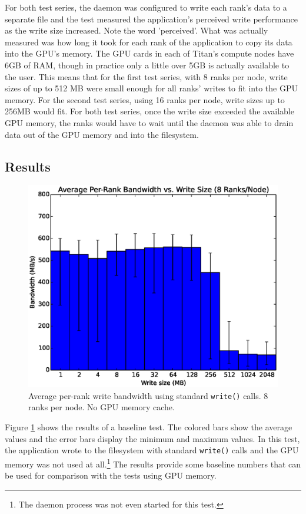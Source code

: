 For both test series, the daemon was configured to write each rank's data to a separate file and the test measured the application's perceived write performance as the write size increased.  Note the word 'perceived'.  What was actually measured was how long it took for each rank of the application to copy its data into the GPU's memory.   The GPU cards in each of Titan's compute nodes have 6GB of RAM, though in practice only a little over 5GB is actually available to the user.  This means that for the first test series, with 8 ranks per node, write sizes of up to 512 MB were small enough for all ranks' writes to fit into the GPU memory.  For the second test series, using 16 ranks per node, write sizes up to 256MB would fit.  For both test series, once the write size exceeded the available GPU memory, the ranks would have to wait until the daemon was able to drain data out of the GPU memory and into the filesystem.


\subsection{Results}
\label{subsec:results}

\begin{figure}
\includegraphics[width=\linewidth]{figures/figure_1.eps}
\caption{Average per-rank write bandwidth using standard \texttt{write()} calls.  8 ranks per node. No GPU memory cache.} 
\label{fig:results_base_8}
\end{figure}

Figure \ref{fig:results_base_8} shows the results of a baseline test.  The colored bars show the average values and the error bars display the minimum and maximum values.  In this test, the application wrote to the filesystem with standard \texttt{write()} calls and the GPU memory was not used at all.\footnote{The daemon process was not even started for this test.}  The results provide some baseline numbers that can be used for comparison with the tests using GPU memory.

